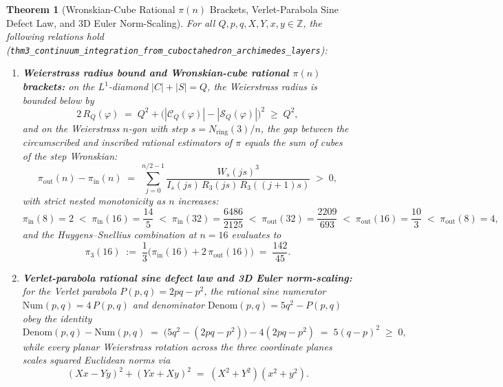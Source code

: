 \documentclass[11pt,a4paper]{article}
\theoremstyle{plain}
\newtheorem{theorem}{Theorem}[section]
\theoremstyle{definition}
\begin{document}
\begin{theorem}[Wronskian-Cube Rational $\pi(n)$ Brackets, Verlet-Parabola Sine Defect Law, and 3D Euler Norm-Scaling]
\label{thm:main-3b}
For all $Q, p, q, X, Y, x, y \in \mathbb{Z}$, the following relations hold (\texttt{thm3\_continuum\_integration\_from\_cuboctahedron\_archimedes\_layers}):
\begin{enumerate}[label=\textbf{(\roman*)},leftmargin=*]
\item \textbf{Weierstrass radius bound and Wronskian-cube rational $\pi(n)$ brackets:}
  on the $L^1$-diamond $|C| + |S| = Q$, the Weierstrass radius is bounded below by
  \begin{equation}
    \label{eq:parallelogram-radius-bound}
    2\,R_Q(\varphi) \;=\; Q^2 + \bigl(|\mathcal{C}_Q(\varphi)| - |\mathcal{S}_Q(\varphi)|\bigr)^2 \;\ge\; Q^2,
  \end{equation}
  and on the Weierstrass $n$-gon with step $s = N_{\mathrm{ring}}(3)/n$, the gap between the circumscribed and inscribed rational estimators of $\pi$ equals the sum of cubes of the step Wronskian:
  \begin{equation}
    \label{eq:pi-wronskian-cube-gap}
    \pi_{\mathrm{out}}(n) - \pi_{\mathrm{in}}(n) \;=\; \sum_{j=0}^{n/2-1}\frac{W_s(js)^3}{I_s(js)\,R_3(js)\,R_3((j+1)s)} \;>\; 0,
  \end{equation}
  with strict nested monotonicity as $n$ increases:
  \begin{equation}
    \label{eq:pi-nested-chain}
    \pi_{\mathrm{in}}(8) = 2 \;<\; \pi_{\mathrm{in}}(16) = \frac{14}{5} \;<\; \pi_{\mathrm{in}}(32) = \frac{6486}{2125} \;<\; \pi_{\mathrm{out}}(32) = \frac{2209}{693} \;<\; \pi_{\mathrm{out}}(16) = \frac{10}{3} \;<\; \pi_{\mathrm{out}}(8) = 4,
  \end{equation}
  and the Huygens--Snellius combination at $n = 16$ evaluates to
  \begin{equation}
    \label{eq:huygens-snellius-16}
    \pi_3(16) \;:=\; \frac{1}{3}\bigl(\pi_{\mathrm{in}}(16) + 2\,\pi_{\mathrm{out}}(16)\bigr) \;=\; \frac{142}{45}.
  \end{equation}

\item \textbf{Verlet-parabola rational sine defect law and 3D Euler norm-scaling:}
  for the Verlet parabola $P(p, q) = 2pq - p^2$, the rational sine numerator $\mathrm{Num}(p, q) = 4\,P(p, q)$ and denominator $\mathrm{Denom}(p, q) = 5q^2 - P(p, q)$ obey the identity
  \begin{equation}
    \label{eq:verlet-sine-defect}
    \mathrm{Denom}(p, q) - \mathrm{Num}(p, q) \;=\; \bigl(5q^2 - (2pq - p^2)\bigr) - 4(2pq - p^2) \;=\; 5(q - p)^2 \;\ge\; 0,
  \end{equation}
  while every planar Weierstrass rotation across the three coordinate planes scales squared Euclidean norms via
  \begin{equation}
    \label{eq:euler-norm-scaling}
    (Xx - Yy)^2 + (Yx + Xy)^2 \;=\; (X^2 + Y^2)(x^2 + y^2).
  \end{equation}
\end{enumerate}
\end{theorem}
\end{document}

